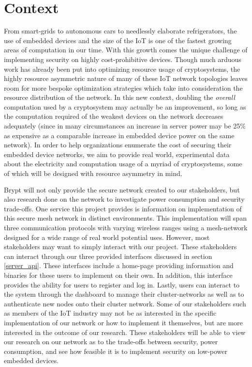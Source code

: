 \documentclass[tikz,a4paper,titlepage]{article}
\begin{document}
\section{Context}

From smart-grids to autonomous cars to needlessly elaborate refrigerators, the use of embedded devices and the size of the IoT is one of the fastest growing areas of computation in our time. With this growth comes the unique challenge of implementing security on highly cost-prohibitive devices. Though much arduous work has already been put into optimizing resource usage of cryptosystems, the highly resource asymmetric nature of many of these IoT network topologies leaves room for more bespoke optimization strategies which take into consideration the resource distribution of the network. In this new context, doubling the \textit{overall} computation used by a cryptosystem may actually be an improvement, so long as the computation required of the weakest devices on the network decreases adequately (since in many circumstances an increase in server power may be 25\% as expensive as a comparable increase in embedded device power on the same network). In order to help organizations enumerate the cost of securing their embedded device networks, we aim to provide real world, experimental data about the electricity and computation usage of a myriad of cryptosystems, some of which will be designed with resource asymmetry in mind. 

Brypt will not only provide the secure network created to our stakeholders, but also research done on the network to investigate power consumption and security trade-offs. One service this project provides is information on implementation of this secure mesh network in distinct environments. This implementation will span three communication protocols with varying wireless ranges using a mesh-network designed for a wide range of real world potential uses. However, most stakeholders may want to simply interact with our project. These stakeholders can interact through our three provided interfaces discussed in section \ref{server_api}. These interfaces include a home-page providing information and binaries for these users to implement on their own. In addition, this interface provides the ability for users to register and log in. Lastly, users can interact to the system through the dashboard to manage their cluster-networks as well as to authenticate new nodes onto their cluster network. Some of our stakeholders such as members of the IoT industry may not be as interested in the specific implementation of our network or how to implement it themselves, but are more interested in the outcome of our research. These stakeholders will be able to view our research on our network as to the trade-offs between security, power consumption, and see how feasible it is to implement security on low-power embedded devices.
\end{document}
